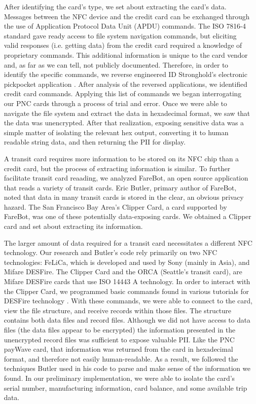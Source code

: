 \documentclass{sig-alternate}
\begin{document}
After identifying the card's type, we set about extracting the card's data. Messages between the NFC device and the credit card can be exchanged through the use of Application Protocol Data Unit (APDU) commands. The ISO 7816-4 standard gave ready access to file system navigation commands, but eliciting valid responses (i.e. getting data) from the credit card required a knowledge of proprietary commands. This additional information is unique to the card vendor and, as far as we can tell, not publicly documented. Therefore, in order to identify the specific commands, we reverse engineered ID Stronghold's electronic pickpocket application \cite{idstronghold-1}. After analysis of the reversed applications, we identified credit card commands.  Applying this list of commands we began interrogating our PNC cards through a process of trial and error.  Once we were able to navigate the file system and extract the data in hexadecimal format, we saw that the data was unencrypted.  After that realization, exposing sensitive data was a simple matter of isolating the relevant hex output, converting it to human readable string data, and then returning the PII for display.     

A transit card requires more information to be stored on its NFC chip than a credit card, but the process of extracting information is similar.  To further facilitate transit card reaading, we analyzed FareBot, an open source application \cite{farebot-1} that reads a variety of transit cards.  Eric Butler, primary author of FareBot, noted that data in many transit cards is stored in the clear, an obvious privacy hazard.  The San Francisco Bay Area's Clipper Card, a card supported by FareBot, was one of these potentially data-exposing cards.  We obtained a Clipper card and set about extracting its information.  

The larger amount of data required for a transit card necessitates a different NFC technology.  Our research and Butler's code rely primarily on two NFC technologies: FeLiCa, which is developed and used by Sony (mainly in Asia), and Mifare DESFire. The Clipper Card and the ORCA (Seattle's transit card), are Mifare DESFire cards that use ISO 14443 A technology.  In order to interact with the Clipper Card, we programmed basic commands found in various tutorials for DESFire technology \cite{public-transport-card-exploits}.  With these commands, we were able to connect to the card, view the file structure, and receive records within those files.  The structure contains both data files and record files.  Although we did not have access to data files (the data files appear to be encrypted) the information presented in the unencrypted record files was sufficient to expose valuable PII.  Like the PNC payWave card, that information was returned from the card in hexadecimal format, and therefore not easily human-readable.  As a result, we followed the techniques Butler used in his code to parse and make sense of the information we found.  In our preliminary implementation, we were able to isolate the card's serial number, manufacturing information, card balance, and some available trip data.
\end{document}
